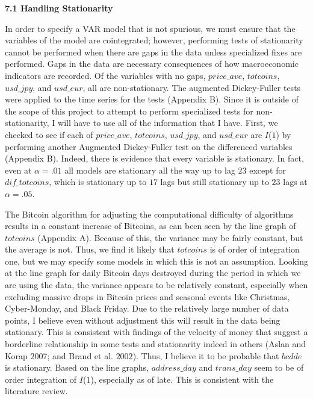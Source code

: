 \documentclass{article}[10 pt]
\newcommand{\vs}{\vspace{0.1in}}
\begin{document}
\textbf{7.1 Handling Stationarity}

\vs

In order to specify a VAR model that is not spurious, we must ensure that
the variables of the model are cointegrated; however, performing tests of
stationarity cannot be performed when there are gaps in the data unless
specialized fixes are performed. Gaps in the data are necessary
consequences of how macroeconomic indicators are recorded. Of the variables
with no gaps, $price\_ave$, $totcoins$, $usd\_jpy$, and $usd\_eur$, all are
non-stationary. The augmented Dickey-Fuller tests were applied to the time
series for the tests (Appendix B). Since it is outside of the scope of this
project to attempt to perform specialized tests for non-stationarity, I
will have to use all of the information that I have. First, we checked to
see if each of $price\_ave$, $totcoins$, $usd\_jpy$, and $usd\_eur$ are
$I$($1$) by performing another Augmented Dickey-Fuller test on the
differenced variables (Appendix B). Indeed, there is evidence that every
variable is stationary. In fact, even at $\alpha = .01$ all models are
stationary all the way up to lag $23$ except for $dif\_totcoins$, which is
stationary up to $17$ lags but still stationary up to $23$ lags at
$\alpha=.05$.

\vs

The Bitcoin algorithm for adjusting the computational difficulty of
algorithms results in a constant increase of Bitcoins, as can been seen by
the line graph of $totcoins$ (Appendix A). Because of this, the variance
may be fairly constant, but the average is not. Thus, we find it likely
that $totcoins$ is of order of integration one, but we may specify some
models in which this is not an assumption. Looking at the line graph for
daily Bitcoin days destroyed during the period in which we are using the
data, the variance appears to be relatively constant, especially when
excluding massive drops in Bitcoin prices and seasonal events like
Christmas, Cyber-Monday, and Black Friday. Due to the relatively large
number of data points, I believe even without adjustment this will result
in the data being stationary. This is consistent with findings of the
velocity of money that suggest a borderline relationship in some tests and
stationarity indeed in others (Aslan and Korap $2007$; and Brand et al.
$2002$). Thus, I believe it to be probable that $bcdde$ is stationary.
Based on the line graphs, $address\_day$ and $trans\_day$ seem to be of
order integration of $I$($1$), especially as of late. This is consistent
with the literature review.
\end{document}
